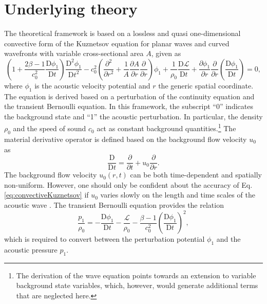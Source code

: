\section{Underlying theory}
\label{sec:Underlying theory}

The theoretical framework is based on a lossless and quasi one-dimensional convective form of the Kuznetsov equation for planar waves and curved wavefronts with variable cross-sectional area $A$, given as
\begin{equation}
    \left(1 + \dfrac{2\beta - 1}{c_0^2}\dfrac{\mathrm{D}\phi_1}{\mathrm{D}t}\right)\dfrac{\mathrm{D}^2\phi_1}{\mathrm{D}t^2}
    - c_0^2\left(\dfrac{\partial^2}{\partial r^2} + \dfrac{1}{A}\dfrac{\partial A}{\partial
        r}\dfrac{\partial}{\partial r}\right)\phi_1
    + \dfrac{1}{\rho_0}\dfrac{\mathrm{D}\mathcal{L}}{\mathrm{D}t}
    + \dfrac{\partial \phi_1}{\partial r}\dfrac{\partial}{\partial r}\left(\dfrac{\mathrm{D}\phi_1}{\mathrm{D}t}\right) = 0,
    \label{eq:convectiveKuznetsov}
\end{equation}
where $\phi_1$ is the acoustic velocity potential and $r$ the generic spatial coordinate. The equation is derived based on a perturbation of the continuity equation and the transient Bernoulli equation. In this framework, the subscript ``0'' indicates the background state and ``1'' the acoustic perturbation. In particular, the density $\rho_0$ and the speed of sound $c_0$ act as constant background quantities.\footnote{The derivation of the wave equation points towards an extension to variable background state variables, which, however, would generate additional terms that are neglected here.} The material derivative operator is defined based on the background flow velocity $u_0$ as
\begin{equation}
    \dfrac{\mathrm{D}}{\mathrm{D}t} = \dfrac{\partial}{\partial t} + u_0 \dfrac{\partial}{\partial r}.
    \label{eq:MaterialDerivative}
\end{equation}
The background flow velocity $u_0\left(r,t\right)$ can be both time-dependent and spatially non-uniform. However, one should only be confident about the accuracy of Eq. \eqref{eq:convectiveKuznetsov} if $u_0$ varies slowly on the length and time scales of the acoustic wave \citep{Pierce_1990}. The transient Bernoulli equation provides the relation
\begin{equation}
    \dfrac{p_1}{\rho_0} = - \dfrac{\mathrm{D}\phi_1}{\mathrm{D}t} - \dfrac{\mathcal{L}}{\rho_0} - \dfrac{\beta - 1}{c_0^2}\left(\dfrac{\mathrm{D}\phi_1}{\mathrm{D}t}\right)^2,
    \label{eq:p1pi1}
\end{equation}
which is required to convert between the perturbation potential $\phi_1$ and the acoustic pressure $p_1$.

